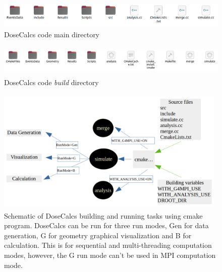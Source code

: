 \documentclass[letterpaper,12pt]{article}
\begin{document}
\begin{figure}[H] %
	\includegraphics[width=13cm, height=1.3cm]{SourceDir.png} %
    \centering
	\caption{DoseCalcs code main directory } 	%
	\label{SrcDir}

\end{figure}
\begin{figure}[H] %
	\includegraphics[width=14cm, height=1.5cm]{BuildDir.png} %
    \centering
	\caption{DoseCalcs code \textit{build} directory } 	%
	\label{BuildDir}

\end{figure}
\begin{figure}[H] %
	\includegraphics[width=11cm,height=6cm]{DoseCalcsBuilding.png} %
    \centering
	\caption{Schematic of DoseCalcs building and running tasks using cmake program. DoseCalcs can be run for three run modes, Gen for data generation, G for geometry graphical visualization and B for calculation. This is for sequential and multi-threading computation modes, however, the G run mode can't be used in MPI computation mode.}
	\label{BuildExecDoseCalcs}
\end{figure}
\end{document}

